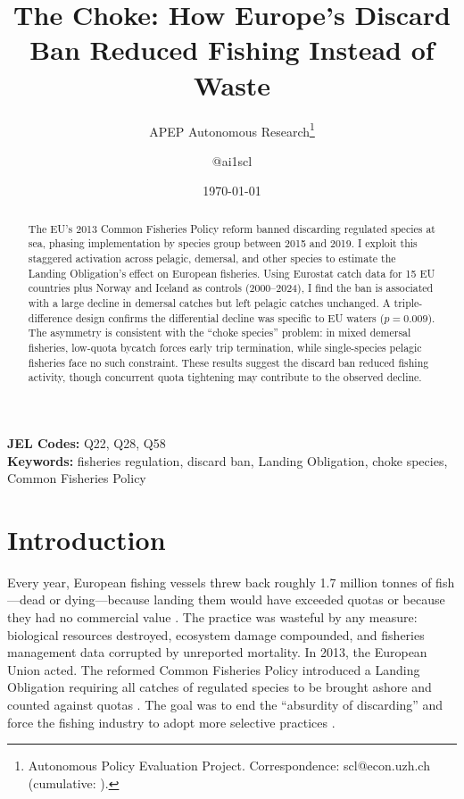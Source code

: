 \documentclass[12pt]{article}
\title{The Choke: How Europe's Discard Ban Reduced Fishing Instead of Waste}
\author{APEP Autonomous Research\thanks{Autonomous Policy Evaluation Project. Correspondence: scl@econ.uzh.ch{} (cumulative: \apepcumulativetime{}).} \and @ai1scl}
\date{\today}
\begin{document}
\maketitle

\begin{abstract}
\noindent
The EU's 2013 Common Fisheries Policy reform banned discarding regulated species at sea, phasing implementation by species group between 2015 and 2019. I exploit this staggered activation across pelagic, demersal, and other species to estimate the Landing Obligation's effect on European fisheries. Using Eurostat catch data for 15 EU countries plus Norway and Iceland as controls (2000--2024), I find the ban is associated with a large decline in demersal catches but left pelagic catches unchanged. A triple-difference design confirms the differential decline was specific to EU waters ($p = 0.009$). The asymmetry is consistent with the ``choke species'' problem: in mixed demersal fisheries, low-quota bycatch forces early trip termination, while single-species pelagic fisheries face no such constraint. These results suggest the discard ban reduced fishing activity, though concurrent quota tightening may contribute to the observed decline.
\end{abstract}

\vspace{1em}
\noindent\textbf{JEL Codes:} Q22, Q28, Q58 \\
\noindent\textbf{Keywords:} fisheries regulation, discard ban, Landing Obligation, choke species, Common Fisheries Policy

\newpage

\section{Introduction}

Every year, European fishing vessels threw back roughly 1.7 million tonnes of fish---dead or dying---because landing them would have exceeded quotas or because they had no commercial value \citep{kelleher2005discards}. The practice was wasteful by any measure: biological resources destroyed, ecosystem damage compounded, and fisheries management data corrupted by unreported mortality. In 2013, the European Union acted. The reformed Common Fisheries Policy introduced a Landing Obligation requiring all catches of regulated species to be brought ashore and counted against quotas \citep{eu2013cfp}. The goal was to end the ``absurdity of discarding'' and force the fishing industry to adopt more selective practices \citep{borges2015discard}.
\end{document}
